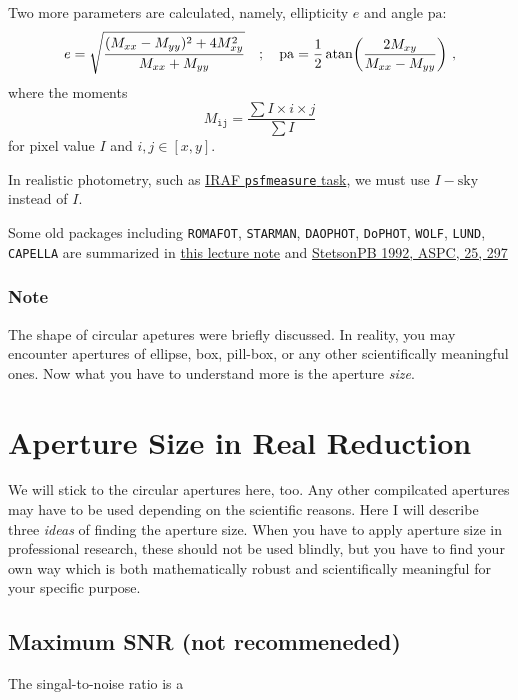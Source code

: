 Two more parameters are calculated, namely, ellipticity $ e $ and angle $ \mathrm{pa} $:
\begin{equation}
  e = \sqrt{\frac{ (M_{xx} - M_{yy})^2 + 4 M_{xy}^2}{M_{xx} + M_{yy}}}
  \quad;\quad
  \mathrm{pa}
    = \frac{1}{2} \atan(\frac{2 M_{xy}}{M_{xx} - M_{yy}}) ~,
\end{equation}
where the moments
\begin{equation}
  M_\mathtt{ij} = \frac{\sum I \times i \times j}{\sum I}
\end{equation}
for pixel value $ I $ and $ i, j \in [x, y] $. 



In realistic photometry, such as \href{https://iraf.net/irafhelp.php?val=psfmeasure&help=Help+Page}{IRAF \texttt{psfmeasure} task}, we must use $ I - \mathrm{sky} $ instead of $ I $. 

Some old packages including \texttt{ROMAFOT}, \texttt{STARMAN}, \texttt{DAOPHOT}, \texttt{DoPHOT}, \texttt{WOLF}, \texttt{LUND}, \texttt{CAPELLA} are summarized in \href{http://web.ipac.caltech.edu/staff/fmasci/home/astro_refs/WhyPSFfit.pdf}{this lecture note} and \href{https://ui.adsabs.harvard.edu/abs/1992ASPC...25..297S/abstract}{StetsonPB 1992, ASPC, 25, 297}


\subsubsection*{Note}
The shape of circular apetures were briefly discussed. In reality, you may encounter apertures of ellipse, box, pill-box, or any other scientifically meaningful ones. Now what you have to understand more is the aperture \emph{size}.

\section{Aperture Size in Real Reduction}
We will stick to the circular apertures here, too. Any other compilcated apertures may have to be used depending on the scientific reasons. Here I will describe three \emph{ideas} of finding the aperture size. When you have to apply aperture size in professional research, these should not be used blindly, but you have to find your own way which is both mathematically robust and scientifically meaningful for your specific purpose.

\subsection{Maximum SNR (not recommeneded)}
The singal-to-noise ratio is a 









